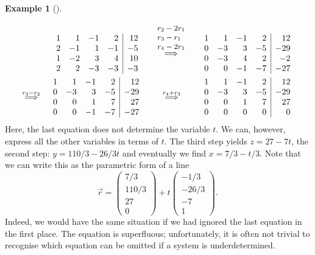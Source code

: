 \documentclass[
  a4paper,
  DIV=11,
  numbers=noendperiod,
  oneside]{scrreprt}
\theoremstyle{definition}
\newtheorem{example}{Example}[chapter]
\theoremstyle{remark}
\begin{document}
\begin{example}[]\protect\hypertarget{exm-ge2}{}\label{exm-ge2}

\[\begin{aligned}
& &\begin{array}{rrrr|r}
 1 &   1& -1 & 2& 12  \\
 2 &  -1 & 1& -1 &-5 \\
1  &   -2& 3 & 4  & 10 \\
2 & 2 & -3 & -3 & -3    
\end{array}  \quad \stackrel{\small \begin{array}{l} r_2-2 r_1 \\  r_3- r_1\\  r_4- 2 r_1 \end{array}}{\Longrightarrow} \quad 
 \begin{array}{rrrr|r}
 1 &   1& -1 & 2& 12  \\
0&   -3 & 3& -5 &-29 \\
 0&  -3& 4 & 2  & -2 \\
  0&  0 &-1 & -7 & -27    
\end{array} \\
&\stackrel{r_3-r_2}{\Longrightarrow}& \begin{array}{rrrr|r}
 1 &   1& -1 & 2& 12  \\
0&   -3 & 3& -5 &-29 \\
0& 0 & 1 & 7  & 27 \\
0& 0 & -1 & -7 & -27    
\end{array} \qquad \stackrel{r_4+r_3}{\Longrightarrow} \qquad \begin{array}{rrrr|r}
1 &   1& -1 & 2& 12  \\
0&   -3 & 3& -5 &-29 \\
0& 0 & 1 & 7  & 27 \\
0 & 0 & 0 &  0 & 0    
\end{array} 
\end{aligned}\] Here, the last equation does not determine the variable
\(t\). We can, however, express all the other variables in terms of
\(t\). The third step yields \(z=27-7 t\), the second step:
\(y=110/3-26/3t\) and eventually we find \(x= 7/3-t/3\). Note that we
can write this as the parametric form of a line
\[\vec{r} =  \begin{pmatrix}   7/3 \\ 110/3 \\ 27 \\ 0  \end{pmatrix}  + t  \begin{pmatrix}   -1/3 \\ -26/3 \\ -7 \\ 1  \end{pmatrix}. \]
Indeed, we would have the same situation if we had ignored the last
equation in the first place. The equation is superfluous; unfortunately,
it is often not trivial to recognise which equation can be omitted if a
system is underdetermined.

\end{example}
\end{document}
